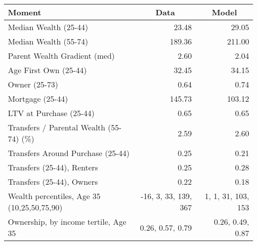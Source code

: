 \begin{tabular}{lrr}
\toprule
\multicolumn{1}{l}{Moment} & \multicolumn{1}{c}{Data} & \multicolumn{1}{c}{Model}\\
\midrule
Median Wealth (25-44) & 23.48 & 29.05\\
Median Wealth (55-74) & 189.36 & 211.00\\
Parent Wealth Gradient (med) & 2.60 & 2.04\\
Age First Own (25-44) & 32.45 & 34.15\\
Owner (25-73) & 0.64 & 0.74\\
Mortgage (25-44) & 145.73 & 103.12\\
LTV at Purchase (25-44) & 0.65 & 0.65\\
Transfers / Parental Wealth (55-74) (\%) & 2.59 & 2.60\\
Transfers Around Purchase (25-44) & 0.25 & 0.21\\
Transfers (25-44), Renters & 0.25 & 0.28\\
Transfers (25-44), Owners & 0.22 & 0.18\\
Wealth percentiles, Age 35 (10,25,50,75,90) & -16, 3, 33, 139, 367 & 1, 1, 31, 103, 153  \\ 
Ownership, by income tertile, Age 35 & 0.26, 0.57, 0.79 & 0.26, 0.49, 0.87  \\ 
\bottomrule
\end{tabular}
